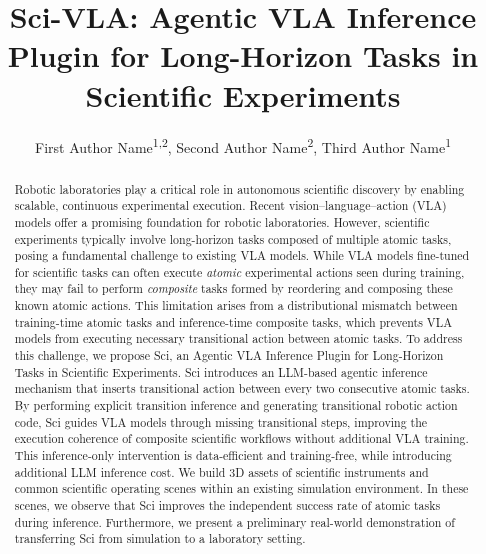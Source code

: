 \documentclass[letterpaper]{article} %
\title{Sci-VLA: Agentic VLA Inference Plugin for Long-Horizon Tasks in Scientific Experiments}
\author {
    First Author Name\textsuperscript{\rm 1,\rm 2}\equalcontrib,
    Second Author Name\textsuperscript{\rm 2}\equalcontrib,
    Third Author Name\textsuperscript{\rm 1}\corresponding
}
\begin{document}
\maketitle

\begin{abstract}
Robotic laboratories play a critical role in autonomous scientific discovery by enabling scalable, continuous experimental execution. Recent vision–language–action (VLA) models offer a promising foundation for robotic laboratories. However, scientific experiments typically involve long-horizon tasks composed of multiple atomic tasks, posing a fundamental challenge to existing VLA models. While VLA models fine-tuned for scientific tasks can often execute \textit{atomic} experimental actions seen during training, they may fail to perform \textit{composite} tasks formed by reordering and composing these known atomic actions. This limitation arises from a distributional mismatch between training-time atomic tasks and inference-time composite tasks, which prevents VLA models from executing necessary transitional action between atomic tasks. To address this challenge, we propose Sci, an Agentic VLA Inference Plugin for Long-Horizon Tasks in Scientific Experiments. Sci introduces an LLM-based agentic inference mechanism that inserts transitional action between every two consecutive atomic tasks. By performing explicit transition inference and generating transitional robotic action code, Sci guides VLA models through missing transitional steps, improving the execution coherence of composite scientific workflows without additional VLA training. This inference-only intervention is data-efficient and training-free, while introducing additional LLM inference cost. We build 3D assets of scientific instruments and common scientific operating scenes within an existing simulation environment. In these scenes, we observe that Sci improves the independent success rate of atomic tasks during inference. Furthermore, we present a preliminary real-world demonstration of transferring Sci from simulation to a laboratory setting.
\end{abstract}

\end{document}
